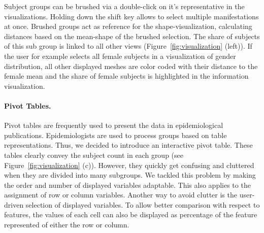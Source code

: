 \documentclass[journal]{style/vgtc} 			          %
\begin{document}
Subject groups can be brushed via a double-click on it's representative in the visualizations.
%
Holding down the shift key allows to select multiple manifestations at once.
%
Brushed groups act as reference for the shape-visualization, calculating distances based on the mean-shape of the brushed selection.
%
The share of subjects of this sub group is linked to all other views (Figure~\ref{fig:visualization} (left)).
%
If the user for example selects all female subjects in a visualization of gender distribution, all other displayed meshes are color coded with their distance to the female mean and the share of female subjects is highlighted in the information visualization.
%

\paragraph{Pivot Tables.}
Pivot tables are frequently used to present the data in epidemiological publications.
%
Epidemiologists are used to process groups based on table representations.
%
Thus, we decided to introduce an interactive pivot table.
%
These tables clearly convey the subject count in each group (see Figure~\ref{fig:visualization} (c)).
%
However, they quickly get confusing and cluttered when they are divided into many subgroups.
%
We tackled this problem by making the order and number of displayed variables adaptable.
%
This also applies to the assignment of row or column variables.
%
Another way to avoid clutter is the user-driven selection of displayed variables.
%
To allow better comparison with respect to features, the values of each cell can also be displayed as percentage of the feature represented of either the row or column.
\end{document}
